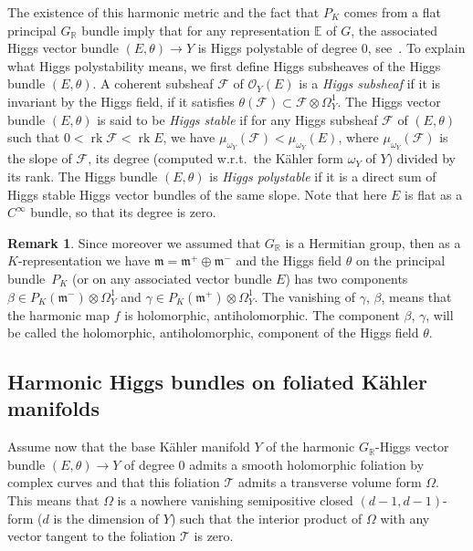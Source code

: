 \documentclass[10pt]{amsart}
\let\mathcal\mathscr
\theoremstyle{plain}
\theoremstyle{definition}
\newtheorem{rema}[theo]{Remark}
\DeclareMathOperator{\rk}{rk}
\newcommand{\cF}{\mathcal{F}}
\newcommand{\cO}{\mathcal{O}}
\newcommand{\cT}{\mathcal{T}}
\newcommand{\bE}{\mathbb{E}}
\newcommand{\bR}{\mathbb{R}}
\newcommand{\fm}{\mathfrak{m}}
\begin{document}
The existence of this harmonic metric and the fact that $P_K$ comes from a flat principal $G_\bR$ bundle imply
that for any representation $\bE$ of $G$, the associated Higgs vector bundle $(E,\theta)\to Y$ is Higgs
polystable of degree 0, see~\cite{S1}. To explain
what Higgs polystability means, we first define Higgs subsheaves of the Higgs bundle $(E,\theta)$.
A coherent subsheaf $\cF$ of $\cO_Y(E)$ is a \emph{Higgs subsheaf} if it is invariant by the Higgs
field, \ie if it satisfies
$\theta(\cF)\subset\cF\otimes\Omega^1_Y$. The Higgs vector bundle $(E,\theta)$ is said to be \emph{Higgs stable} if
for any Higgs subsheaf $\cF$ of $(E,\theta)$ such that $0<\rk\cF<\rk E$, we have
$\mu_{\omega_Y}(\cF)<\mu_{\omega_Y}(E)$, where $\mu_{\omega_Y}(\cF)$ is
the slope of $\cF$, \ie its degree (computed w.r.t.\ the Kähler form $\omega_Y$ of $Y$) divided by its rank. The
Higgs bundle $(E,\theta)$ is \emph{Higgs polystable} if it is a direct sum of Higgs stable Higgs vector bundles
of the same slope.
Note that here $E$ is flat as a $C^\infty$ bundle, so that its degree is zero.

\begin{rema}\label{rem:real}
Since moreover we assumed that $G_\bR$ is a Hermitian group, then as a $K$-representation we have
$\fm=\fm^+\oplus\fm^-$
and the Higgs field $\theta$ on the principal bundle~$P_K$ (or on any associated vector bundle $E$) has two
components \hbox{$\beta\in P_K(\fm^-)\otimes\Omega^1_Y$} and $\gamma\in P_K(\fm^+)\otimes\Omega^1_Y$. The
vanishing of $\gamma$, \resp $\beta$, means that the harmonic map $f$ is holomorphic, \resp antiholomorphic. The component $\beta$, \resp $\gamma$, will be called the holomorphic, \resp antiholomorphic, component of the Higgs field $\theta$.
\end{rema}

\subsection{Harmonic Higgs bundles on foliated Kähler manifolds}\label{subsec:HiggsFol}

Assume now that the base Kähler manifold $Y$ of the harmonic $G_\bR$-Higgs vector bundle
$(E,\theta)\to Y$ of degree $0$ admits a smooth holomorphic
foliation by complex curves and that this foliation $\cT$ admits a transverse volume form
$\Omega$. This means that $\Omega$ is a nowhere vanishing semipositive closed $(d-1,d-1)$-form ($d$ is the
dimension of $Y$) such that the interior product of $\Omega$ with any vector tangent to the
foliation $\cT$ is zero.
\end{document}
